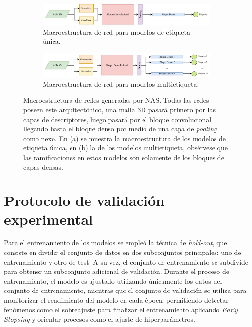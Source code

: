 \begin{figure}[h]
    \begin{subfigure}{\textwidth}
        \centering
        \includegraphics[width=\linewidth]{figures/4_materials-methods/NAS_sample1.pdf}
        \caption{Macroestructura de red para modelos de etiqueta única.}
        \label{single_label_nets}
    \end{subfigure}

    \begin{subfigure}{\textwidth}
        \centering
        \includegraphics[width=\linewidth]{figures/4_materials-methods/NAS_sample2.pdf}
        \caption{Macroestructura de red para modelos multietiqueta.}
        \label{multi_label_nets}
    \end{subfigure}
    \caption[Macroestructura de redes generadas por NAS]{Macroestructura de redes generadas por NAS. Todas las redes poseen este  arquitectónico, una malla 3D pasará primero por las capas de descriptores, luego pasará por el bloque convolucional llegando hasta el bloque denso por medio de una capa de \textit{pooling} como nexo. En (a) se muestra la macroestructura de los modelos de etiqueta única, en (b) la de los modelos multietiqueta, obsérvese que las ramificaciones en estos modelos son solamente de los bloques de capas densas.}
    \label{nas_macrostruct}

\end{figure}

\section{Protocolo de validación experimental}
Para el entrenamiento de los modelos se empleó la técnica de \textit{hold-out}, que consiste en dividir el conjunto de datos en dos subconjuntos principales: uno de entrenamiento y otro de test. A su vez, el conjunto de entrenamiento se subdivide para obtener un subconjunto adicional de validación. Durante el proceso de entrenamiento, el modelo es ajustado utilizando únicamente los datos del conjunto de entrenamiento, mientras que el conjunto de validación se utiliza para monitorizar el rendimiento del modelo en cada época, permitiendo detectar fenómenos como el sobreajuste para finalizar el entrenamiento aplicando \textit{Early Stopping} y orientar procesos como el ajuste de hiperparámetros.

